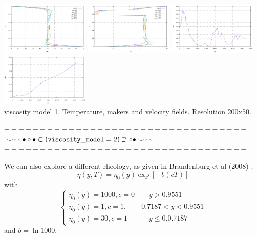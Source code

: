 \begin{center}
\includegraphics[width=4.2cm]{python_codes/fieldstone_88/results/model1/profile_T.pdf}
\includegraphics[width=4.2cm]{python_codes/fieldstone_88/results/model1/profile_eta.pdf}
\includegraphics[width=4.2cm]{python_codes/fieldstone_88/results/model1/vrms.pdf}
\includegraphics[width=4.2cm]{python_codes/fieldstone_88/results/model1/Tavrg.pdf}\\
{\captionfont viscosity model 1. Temperature, makers and velocity fields. Resolution 200x50.}
\end{center}


\newpage
\begin{center}
$----------------------------------$\\
$\smile \frown \bullet \circ \bullet \subset ( {\tt viscosity\_model=2} ) \supset \circ \bullet \smile \frown$\\
$----------------------------------$
\end{center}

We can also explore a different rheology, as given in Brandenburg et al (2008) \cite{brhv08}:
\[
\eta(y,T) = \eta_0(y) \exp [-b(cT)]
\]
with 
\[
\left\{
\begin{array}{c}
\eta_0(y)=1000, c=0 \qquad y> 0.9551 \\
\eta_0(y)=1,    c=1, \qquad  0.7187  <y< 0.9551 \\
\eta_0(y)=30,   c=1  \qquad\quad y \le 0.0.7187
\end{array}
\right.
\]
and $b=\ln 1000$.

